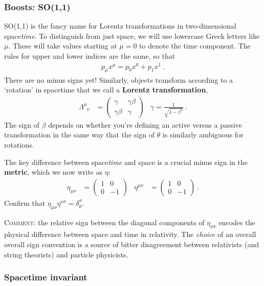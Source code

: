 \documentclass[12pt]{article}
\begin{document}
\subsubsection{Boosts: SO(1,1)}

SO(1,1) is the fancy name for Lorentz transformations in two-dimensional space\emph{time}. To distinguish from just space, we will use lowercase Greek letters like $\mu$. These will take values starting at $\mu = 0$ to denote the time component. The rules for upper and lower indices are the same, so that 
\begin{align}
	p_\mu x^\mu = p_0 x^0 + p_1 x^1 \ .
\end{align}
There are no minus signs yet! Similarly, objects transform according to a `rotation' in spacetime that we call a \textbf{Lorentz transformation},
\begin{align}
	\Lambda^\mu_{\phantom \mu \nu} &= 
	\begin{pmatrix}
		\gamma & \gamma \beta
		\\
		\gamma \beta & \gamma
	\end{pmatrix}
	&
	\gamma = \frac{1}{\sqrt{1-\beta^2}} \ .
	\label{eq:boost}
\end{align}
The sign of $\beta$ depends on whether you're defining an active versus a passive transformation in the same way that the sign of $\theta$ is similarly ambiguous for rotations.

The key difference between space\emph{time} and space is a crucial minus sign in the \textbf{metric}, which we now write as $\eta$:
\begin{align}
	\eta_{\mu\nu} &= \begin{pmatrix}
		1 & 0 \\
		0 & -1
	\end{pmatrix}
	&
	\eta^{\mu\nu} &= \begin{pmatrix}
		1 & 0 \\
		0 & -1
	\end{pmatrix} \ .
\end{align}
Confirm that $\eta_{\mu\nu} \eta^{\nu\sigma} = \delta^\sigma_\mu$.

\textsc{Comment}: the relative sign between the diagonal components of $\eta_{\mu\nu}$ encodes the physical difference between space and time in relativity. The \emph{choice} of an overall overall sign convention is a source of bitter disagreement between relativists (and string theorists) and particle physicists. 


\subsubsection{Spacetime invariant}
\end{document}
